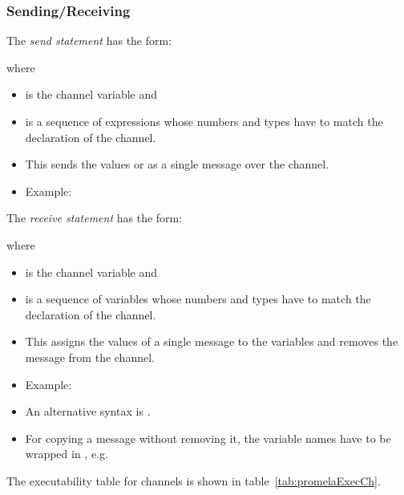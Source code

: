 			\subsubsection{Sending/Receiving}
				The \textit{send statement} has the form:
				\begin{center}
				\end{center}
				where
				\begin{itemize}
					\item {} is the channel variable and
					\item {} is a sequence of expressions whose numbers and types have to match the declaration of the channel.
					\item This sends the values or  as a single message over the channel.
					\item Example: 
				\end{itemize}

				The \textit{receive statement} has the form:
				\begin{center}
				\end{center}
				where
				\begin{itemize}
					\item {} is the channel variable and
					\item {} is a sequence of variables whose numbers and types have to match the declaration of the channel.
					\item This assigns the values of a single message to the variables  and removes the message from the channel.
					\item Example: 
					\item An alternative syntax is .
					\item For copying a message without removing it, the variable names have to be wrapped in \inlinePromela{< >}, e.g. 
				\end{itemize}

				The executability table for channels is shown in table~\ref{tab:promelaExecCh}.

